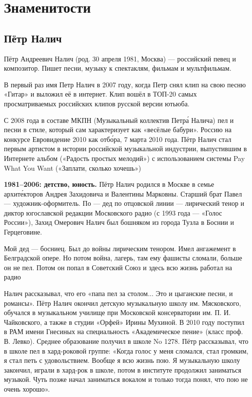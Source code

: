 \chapter{Знаменитости}

\section{Пётр Налич}
Пётр Андреевич Налич (род. 30 апреля 1981, Москва) --- российский певец и композитор. Пишет песни, музыку к спектаклям, фильмам и мультфильмам.

В первый раз имя Петр Налич  в 2007 году, когда Петр снял клип на свою песню «Гитар» и выложил её в интернет. Клип вошёл в ТОП-20 самых просматриваемых российских клипов русской версии ютьюба.

С 2008 года в составе МКПН (Музыкальный коллектив Петр\'{а} Налича) пел и  песни в стиле, который сам характеризует как «весёлые бабури».  Россию на конкурсе Евровидение 2010 как  отб\'{о}ра,  7 марта 2010 года. Пётр Налич стал первым артистом в истории российской музыкальной индустрии, выпустившим в Интернете альбом («Радость простых мелодий») с использованием системы Pay What You Want («Заплати, сколько хочешь»)

\textbf{1981--2006: детство, юность.}
Пётр Налич родился в Москве в семье архит\'{е}кторов Андрея Захидовича и Валентины Марковны. Старший брат Павел --- художник-оформитель. По  --- дед по отцовской линии --- лирический тенор и диктор югославской редакции Московского радио (с 1993 года --- «Голос России»), Захид Омерович Налич был бошняком из города Тузла в Боснии и Герцеговине.

\begin{fancyquotes}
    Мой дед --- босниец. Был до войны лирическим тенором. Имел ангажемент в Белградской опере. Но потом война, лагерь, там ему фашисты  сломали, больше он не пел. Потом он попал в Советский Союз и здесь всю жизнь работал на радио
\end{fancyquotes}

Налич рассказывал, что его «папа  пел за столом... Это и цыганские песни, и романсы». Пётр Налич окончил детскую музыкальную школу им. Мясковского, обучался в музыкальном училище при Московской консерватории им. П. И. Чайковского, а также в студии «Орфей»  Ирины Мухиной. В 2010 году поступил в РАМ имени Гнесиных на специальность «Академическое пение» (класс проф. В. Левко). Среднее образование получил в школе No 1278. Пётр рассказывал, что в школе пел в хард-роковой группе: «Когда голос у меня сломался, стал громким, я стал петь с удовольствием. Вообще я всю жизнь пою. Я музыкальную школу закончил, играли в хард-рок в школе, потом в институте продолжил заниматься музыкой. Чуть позже начал заниматься вокалом и только тогда понял, что пою не очень хорошо».

